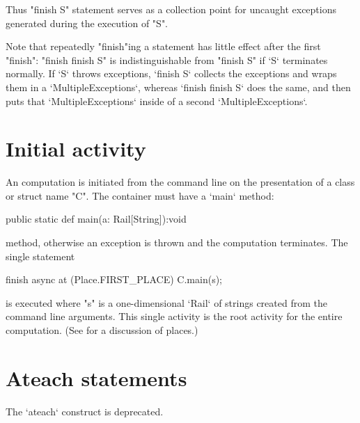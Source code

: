 Thus \xcd"finish S" statement serves as a collection point for
uncaught exceptions generated during the execution of \xcd"S".

Note that repeatedly \xcd"finish"ing a statement has little effect after
the first \xcd"finish": \xcd"finish finish S" is indistinguishable
from \xcd"finish S" if \xcd`S` terminates normally.  If \xcd`S` throws
exceptions, \xcd`finish S` collects the exceptions and wraps them in a 
\xcd`MultipleExceptions`, whereas \xcd`finish finish S` does the same, and
then puts that \xcd`MultipleExceptions` inside of a second
\xcd`MultipleExceptions`. 


\section{Initial activity}\label{initial-computation}

An \Xten{} computation is initiated from the command line on the
presentation of a class or struct name \xcd"C". The container must have a 
\xcd`main` method: 
\begin{xtenmath}
public static def main(a: Rail[String]):void
\end{xtenmath}
method, 
otherwise an exception is thrown
and the computation terminates.  The single statement
\begin{xten}
finish async at (Place.FIRST_PLACE) {
  C.main(s);
}
\end{xten} 
\noindent is executed where \xcd"s" is a one-dimensional \xcd`Rail` of
strings created 
from the command line arguments. This single activity is the root activity
for the entire computation. (See  for a discussion of
places.)


\section{Ateach statements}\label{ateach-section}
\deprecated{} The \xcd`ateach` construct is deprecated.

